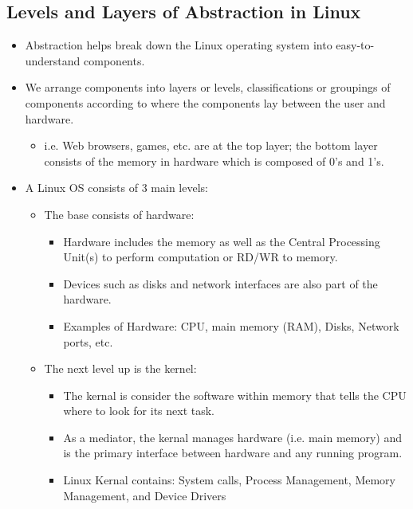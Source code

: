 \documentclass{article}
\begin{document}
	\subsection{Levels and Layers of Abstraction in Linux}
	\begin{itemize}
		
		\item Abstraction helps break down the Linux operating system into easy-to-understand components.
		
		\item We arrange components into layers or levels, classifications or groupings of components according to where the components lay between the user and hardware.
		
		\begin{itemize}
			\item i.e. Web browsers, games, etc. are at the top layer; the bottom layer consists of the memory in hardware which is composed of 0's and 1's.
		\end{itemize}
	
		\item A Linux OS consists of 3 main levels:
		
		\begin{itemize}
			
			\item The base consists of hardware:
				\begin{itemize}
					\item Hardware includes the memory as well as the Central Processing Unit(s) to perform computation or RD/WR to memory.
					\item Devices such as disks and network interfaces are also part of the hardware.
					\item Examples of Hardware: CPU, main memory (RAM), Disks, Network ports, etc.
				\end{itemize}
			
			\item The next level up is the kernel:
				\begin{itemize}
					\item The kernal is consider the software within memory that tells the CPU where to look for its next task.
					\item As a mediator, the kernal manages hardware (i.e. main memory) and is the primary interface between hardware and any running program.
					\item Linux Kernal contains: System calls, Process Management, Memory Management, and Device Drivers
				\end{itemize}
			

\end{itemize}
\end{itemize}
\end{document}
